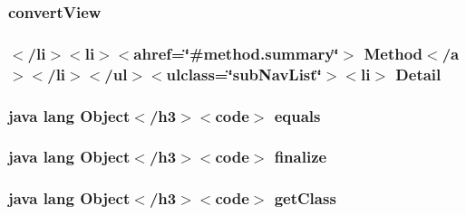 \hypertarget{_sensors_list_adapter_8html_a074c9ae2abe97703c9c031be7f3eb2e5}{
\subsubsection[{convert\-View}]{\setlength{\rightskip}{0pt plus 5cm}convert\-View}}\label{_sensors_list_adapter_8html_a074c9ae2abe97703c9c031be7f3eb2e5}
\hypertarget{_sensors_list_adapter_8html_a1e04b5ec07bcd5281e26dcd40e5b3a94}{
\subsubsection[{Detail}]{\setlength{\rightskip}{0pt plus 5cm}$<$/li$>$$<$li$>$$<$ahref=\char`\"{}\#method.\-summary\char`\"{}$>$ Method$<$/{\bf a}$>$$<$/li$>$$<$/ul$>$$<$ulclass=\char`\"{}sub\-Nav\-List\char`\"{}$>$$<$li$>$ Detail}}\label{_sensors_list_adapter_8html_a1e04b5ec07bcd5281e26dcd40e5b3a94}
\hypertarget{_sensors_list_adapter_8html_a8974318cea585f72df717e0380ec7104}{
\subsubsection[{equals}]{\setlength{\rightskip}{0pt plus 5cm}java lang Object$<$/h3$>$$<$code$>$ equals}}\label{_sensors_list_adapter_8html_a8974318cea585f72df717e0380ec7104}
\hypertarget{_sensors_list_adapter_8html_ab2315181ead4aeedef2374039b6ddde7}{
\subsubsection[{finalize}]{\setlength{\rightskip}{0pt plus 5cm}java lang Object$<$/h3$>$$<$code$>$ finalize}}\label{_sensors_list_adapter_8html_ab2315181ead4aeedef2374039b6ddde7}
\hypertarget{_sensors_list_adapter_8html_a98e6644727fe65eac217a6855045be43}{
\subsubsection[{get\-Class}]{\setlength{\rightskip}{0pt plus 5cm}java lang Object$<$/h3$>$$<$code$>$ get\-Class}}\label{_sensors_list_adapter_8html_a98e6644727fe65eac217a6855045be43}
